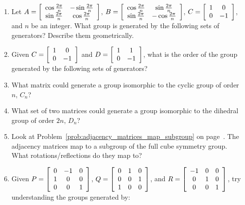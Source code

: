 \documentclass[../textbook.tex]{subfiles}
\begin{document}
\begin{enumerate}
\item Let $A=\left[\begin{array}{cc} \cos\frac{2\pi}{n} & -\sin\frac{2\pi}{n} \\ \sin\frac{2\pi}{n} & \cos\frac{2\pi}{n} \end{array}\right]$, $B=\left[\begin{array}{cc} \cos\frac{2\pi}{n} & \sin\frac{2\pi}{n} \\ \sin\frac{2\pi}{n} & -\cos\frac{2\pi}{n} \end{array}\right]$, $C=\left[\begin{array}{cc} 1 & 0 \\ 0 & -1 \end{array}\right]$, and $n$ be an integer. What group is generated by the following sets of generators? Describe them geometrically.
\begin{enumerate}
\end{enumerate}
\item Given $C=\left[\begin{array}{cc} 1 & 0 \\ 0 & -1 \end{array}\right]$ and $D=\left[\begin{array}{cc} 1 & 1 \\ 0 & -1 \end{array}\right]$, what is the order of the group generated by the following sets of generators?
\begin{enumerate}
\end{enumerate}
\item What matrix could generate a group isomorphic to the cyclic group of order $n$, $C_n$?
\item What set of two matrices could generate a group isomorphic to the dihedral group of order $2n$, $D_n$?
\item Look at Problem~\ref{prob:adjacency_matrices_map_subgroup} on page~\pageref{prob:adjacency_matrices_map_subgroup}. The adjacency matrices map to a subgroup of the full cube symmetry group. What rotations/reflections do they map to?
\item Given $P=\left[\begin{array}{ccc} 0 & -1 & 0 \\ 1 & 0 & 0 \\ 0 & 0 & 1 \end{array}\right]$, $Q=\left[\begin{array}{ccc} 0 & 1 & 0 \\ 0 & 0 & 1 \\ 1 & 0 & 0 \end{array}\right]$, and $R=\left[\begin{array}{ccc} -1 & 0 & 0 \\ 0 & 1 & 0 \\ 0 & 0 & 1 \end{array}\right]$, try understanding the groups generated by:
\begin{enumerate}
\end{enumerate}
\end{enumerate}
\end{document}
